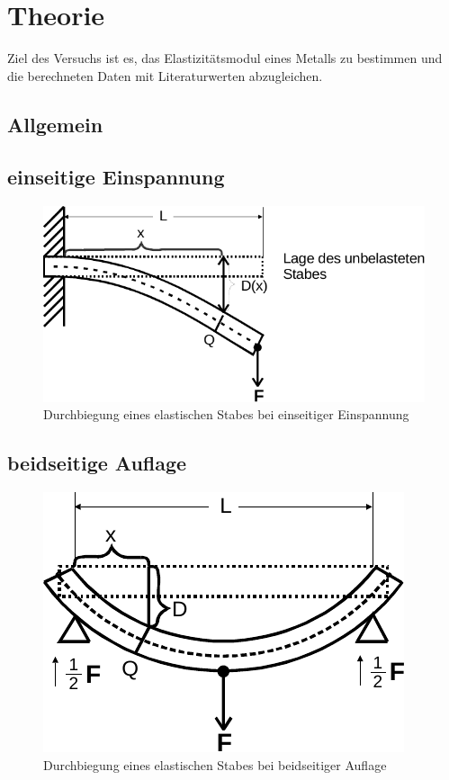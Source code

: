 \section{Theorie}
\label{sec:Theorie}

Ziel des Versuchs ist es, das Elastizitätsmodul eines Metalls zu bestimmen und die berechneten Daten mit Literaturwerten abzugleichen.


\subsection{Allgemein}




\subsection{einseitige Einspannung}

\begin{figure}
    \centering
    \includegraphics{content/einseitig.pdf}
    \caption{Durchbiegung eines elastischen Stabes bei einseitiger Einspannung \cite[107]{V103}}
    \label{fig:einseits}
  \end{figure}

\subsection{beidseitige Auflage}

\begin{figure}
  \centering
  \includegraphics{content/beidseits.pdf}
  \caption{Durchbiegung eines elastischen Stabes bei beidseitiger Auflage\cite[110]{V103}}
  \label{fig:beidseits}
\end{figure}


\cite{sample}
